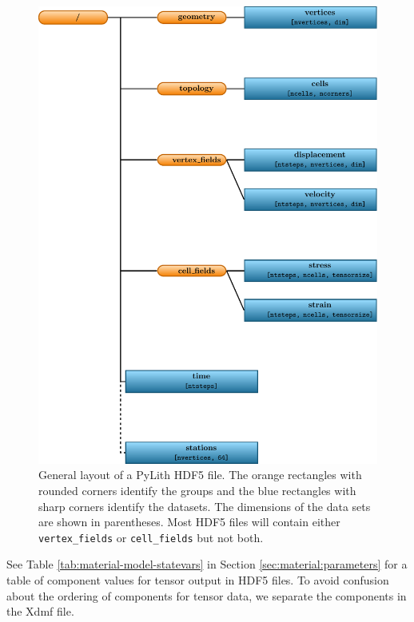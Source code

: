 \noindent \begin{center}
\begin{figure}[H]
\noindent \begin{centering}
\includegraphics{runpylith/figs/hdf5layout}
\par\end{centering}

\caption{General layout of a PyLith HDF5 file. The orange rectangles with rounded
corners identify the groups and the blue rectangles with sharp corners
identify the datasets. The dimensions of the data sets are shown in
parentheses. Most HDF5 files will contain either \texttt{vertex\_fields}
or \texttt{cell\_fields} but not both. \label{fig:hdf5:layout}}
\end{figure}

\par\end{center}

See Table \vref{tab:material-model-statevars} in Section \vref{sec:material:parameters}
for a table of component values for tensor output in HDF5 files. To
avoid confusion about the ordering of components for tensor data,
we separate the components in the Xdmf file.

